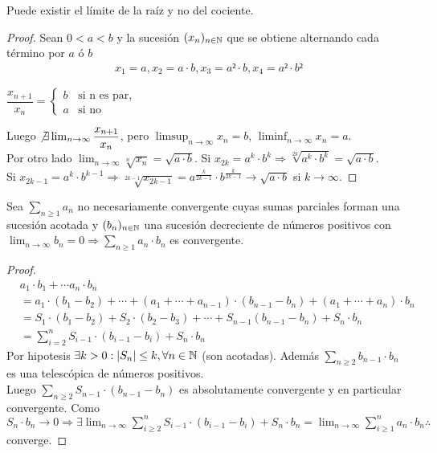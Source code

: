 \begin{eg}
  Puede existir el límite de la raíz y no del cociente.
  \begin{proof}
    Sean $0 < a < b$ y la sucesión $(x_n)_{n \in \mathbb{N}}$ que se obtiene alternando cada término por $a$ ó $b$ \begin{align*}
      x_1 = a, x_2 = a \cdot b, x_3 = a² \cdot b, x_4 = a² \cdot b²
    \end{align*}

    $\dfrac{x_{n+1}}{x_n} = \begin{cases}
        b & \text{si n es par}, \\
        a & \text{si no}
      \end{cases}$

    Luego $\not \exists \lim_{n \to \infty} \dfrac{x_{n+1}}{x_n}$, pero $\limsup_{n \to \infty} x_n = b$, $\liminf_{n \to \infty} x_n = a$. \\
    Por otro lado $\lim_{n \to \infty} \sqrt[n]{x_n} = \sqrt{a \cdot b}$. Si $x_{2k} = a^k \cdot b^k \Rightarrow \sqrt[2k]{a^k \cdot b^k} = \sqrt{a \cdot b}$. \\
    Si $x_{2k-1} = a^k \cdot b^{k-1} \Rightarrow \sqrt[2k-1]{x_{2k-1}} = a^{\frac{k}{2k-1}} \cdot b^{\frac{k}{2k-1}} \to \sqrt{a \cdot b}$ si $k \to \infty$.
  \end{proof}
\end{eg}

\begin{theorem}[Dirichlet]
  Sea $\sum_{n \geq 1} a_n$ no necesariamente convergente cuyas sumas parciales forman una sucesión acotada y $(b_n)_{n \in \mathbb{N}}$ una sucesión decreciente de números positivos con $\lim_{n \to \infty} b_n = 0 \Rightarrow \sum_{n \geq 1} a_n \cdot b_n$ es convergente.

  \begin{proof}
    \begin{align*}
       & a_1 \cdot b_1 + \cdots a_n \cdot b_n                                                                                \\
       & = a_1 \cdot (b_1 - b_2) +  \cdots + (a_1 + \cdots + a_{n-1}) \cdot (b_{n-1} - b_n) + (a_1 + \cdots + a_n) \cdot b_n \\
       & = S_1 \cdot (b_1 - b_2) + S_2 \cdot (b_2 - b_3) + \cdots + S_{n-1} (b_{n-1} - b_n) + S_n \cdot b_n                  \\
       & = \sum_{i = 2}^n S_{i-1} \cdot (b_{i-1} - b_i) + S_n \cdot b_n
    \end{align*}
    Por hipotesis $\exists k > 0 : |S_n| \leq k, \forall n \in \mathbb{N}$ (son acotadas). Además $\sum_{n \geq 2} b_{n-1} \cdot b_n$ es una telescópica de números positivos. \\
    Luego $\sum_{n \geq 2} S_{n-1} \cdot (b_{n-1} - b_n)$ es absolutamente convergente y en particular convergente.
    Como $S_n \cdot b_n \to 0 \Rightarrow \exists \lim_{n \to \infty} \sum_{i \geq 2}^n S_{i-1} \cdot (b_{i-1} - b_i) + S_n \cdot b_n = \lim_{n \to \infty} \sum_{i \geq 1}^n a_n \cdot b_n \therefore$ converge.
  \end{proof}
\end{theorem}

